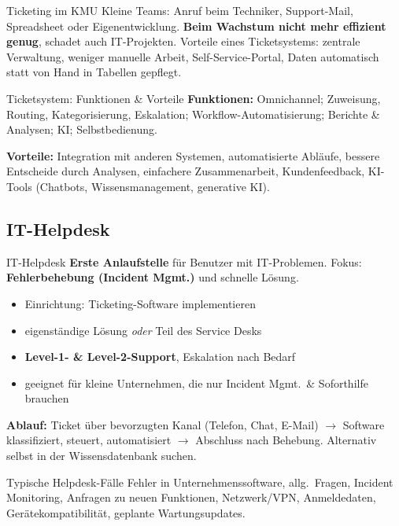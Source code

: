 \documentclass[a4paper, fontsize=7pt]{scrartcl}
\begin{document}
\begin{subbox}{Ticketing im KMU}
Kleine Teams: Anruf beim Techniker, Support-Mail, Spreadsheet oder
Eigenentwicklung. \textbf{Beim Wachstum nicht mehr effizient genug}, schadet
auch IT-Projekten. Vorteile eines Ticketsystems: zentrale Verwaltung, weniger
manuelle Arbeit, Self-Service-Portal, Daten automatisch statt von Hand in
Tabellen gepflegt.
\end{subbox}

\begin{mainbox}{Ticketsystem: Funktionen \& Vorteile}
\textbf{Funktionen:} Omnichannel; Zuweisung, Routing, Kategorisierung,
Eskalation; Workflow-Automatisierung; Berichte \& Analysen; KI; Selbstbedienung.

\textbf{Vorteile:} Integration mit anderen Systemen, automatisierte Abläufe,
bessere Entscheide durch Analysen, einfachere Zusammenarbeit, Kundenfeedback,
KI-Tools (Chatbots, Wissensmanagement, generative KI).
\end{mainbox}

\subsection{IT-Helpdesk}

\begin{mainbox}{IT-Helpdesk}
\textbf{Erste Anlaufstelle} für Benutzer mit IT-Problemen. Fokus:
\textbf{Fehlerbehebung (Incident Mgmt.)} und schnelle Lösung.
\begin{itemize}
    \item Einrichtung: Ticketing-Software implementieren
    \item eigenständige Lösung \emph{oder} Teil des Service Desks
    \item \textbf{Level-1- \& Level-2-Support}, Eskalation nach Bedarf
    \item geeignet für kleine Unternehmen, die nur Incident Mgmt.\ \&
          Soforthilfe brauchen
\end{itemize}
\textbf{Ablauf:} Ticket über bevorzugten Kanal (Telefon, Chat, E-Mail)
$\to$ Software klassifiziert, steuert, automatisiert $\to$ Abschluss nach
Behebung. Alternativ selbst in der Wissensdatenbank suchen.
\end{mainbox}

\begin{subbox}{Typische Helpdesk-Fälle}
Fehler in Unternehmenssoftware, allg.\ Fragen, Incident Monitoring, Anfragen zu
neuen Funktionen, Netzwerk/VPN, Anmeldedaten, Gerätekompatibilität, geplante
Wartungsupdates.
\end{subbox}
\end{document}
